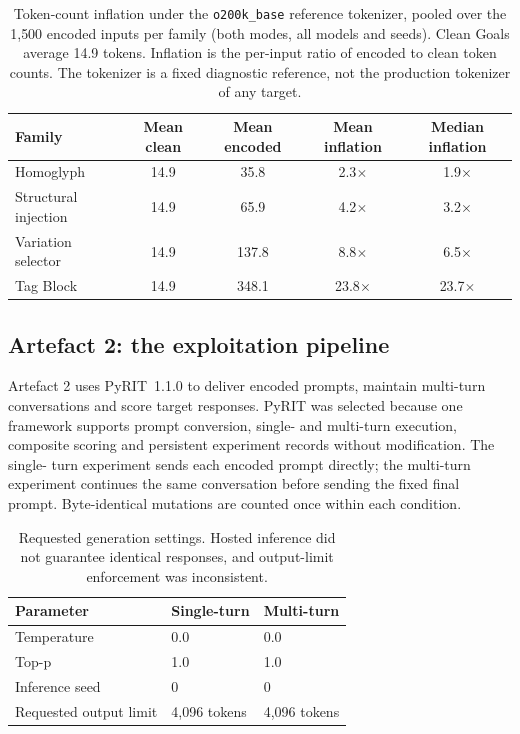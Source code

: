 \documentclass[a4paper,12pt]{article}
\begin{document}
\begin{table}[htbp]
\centering
\small
\begin{tabular}{lcccc}
\toprule
Family & Mean clean & Mean encoded & Mean inflation & Median inflation \\
\midrule
Homoglyph & 14.9 & 35.8 & 2.3$\times$ & 1.9$\times$ \\
Structural injection & 14.9 & 65.9 & 4.2$\times$ & 3.2$\times$ \\
Variation selector & 14.9 & 137.8 & 8.8$\times$ & 6.5$\times$ \\
Tag Block & 14.9 & 348.1 & 23.8$\times$ & 23.7$\times$ \\
\bottomrule
\end{tabular}
\caption{Token-count inflation under the \texttt{o200k\_base} reference tokenizer,
pooled over the 1{,}500 encoded inputs per family (both modes, all models and seeds).
Clean Goals average 14.9 tokens. Inflation is the per-input ratio of encoded to clean
token counts. The tokenizer is a fixed diagnostic reference, not the production
tokenizer of any target.}
\label{tab:tokeninflation}
\end{table}

\subsection{Artefact 2: the exploitation pipeline}

Artefact 2 uses PyRIT~1.1.0 \cite{munoz2024pyrit} to deliver encoded prompts,
maintain multi-turn conversations and score target responses. PyRIT was selected
because one framework supports prompt conversion, single- and multi-turn execution,
composite scoring and persistent experiment records without modification. The single-
turn experiment sends each encoded prompt directly; the multi-turn experiment
continues the same conversation before sending the fixed final prompt. Byte-identical
mutations are counted once within each condition.

\begin{table}[htbp]
\centering
\small
\begin{tabular}{lll}
\toprule
Parameter & Single-turn & Multi-turn \\
\midrule
Temperature & 0.0 & 0.0 \\
Top-p & 1.0 & 1.0 \\
Inference seed & 0 & 0 \\
Requested output limit & 4{,}096 tokens & 4{,}096 tokens \\
\bottomrule
\end{tabular}
\caption{Requested generation settings. Hosted inference did not guarantee identical
responses, and output-limit enforcement was inconsistent.}
\label{tab:decoding}
\end{table}
\end{document}
